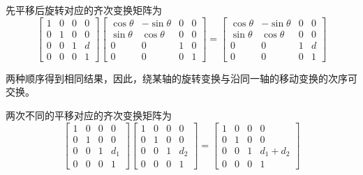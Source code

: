\documentclass{homework}
\begin{document}
\begin{sol}
  先平移后旋转对应的齐次变换矩阵为
  \[
    \begin{bmatrix}
      1 & 0 & 0 & 0 \\
      0 & 1 & 0 & 0 \\
      0 & 0 & 1 & d \\
      0 & 0 & 0 & 1 
    \end{bmatrix}
    \begin{bmatrix}
      \cos\theta & -\sin\theta & 0 & 0 \\
      \sin\theta & \cos\theta & 0 & 0 \\
      0 & 0 & 1 & 0 \\
      0 & 0 & 0 & 1 
    \end{bmatrix}
    =
    \begin{bmatrix}
      \cos\theta & -\sin\theta & 0 & 0 \\
      \sin\theta & \cos\theta & 0 & 0 \\
      0 & 0 & 1 & d \\
      0 & 0 & 0 & 1 
    \end{bmatrix}
  \]

  两种顺序得到相同结果，因此，绕某轴的旋转变换与沿同一轴的移动变换的次序可交换。

  两次不同的平移对应的齐次变换矩阵为
  \[
    \begin{bmatrix}
      1 & 0 & 0 & 0 \\
      0 & 1 & 0 & 0 \\
      0 & 0 & 1 & d_1 \\
      0 & 0 & 0 & 1 
    \end{bmatrix}
    \begin{bmatrix}
      1 & 0 & 0 & 0 \\
      0 & 1 & 0 & 0 \\
      0 & 0 & 1 & d_2 \\
      0 & 0 & 0 & 1 
    \end{bmatrix}
    =
    \begin{bmatrix}
      1 & 0 & 0 & 0 \\
      0 & 1 & 0 & 0 \\
      0 & 0 & 1 & d_1 + d_2 \\
      0 & 0 & 0 & 1 
    \end{bmatrix}
  \]


\end{sol}
\end{document}

